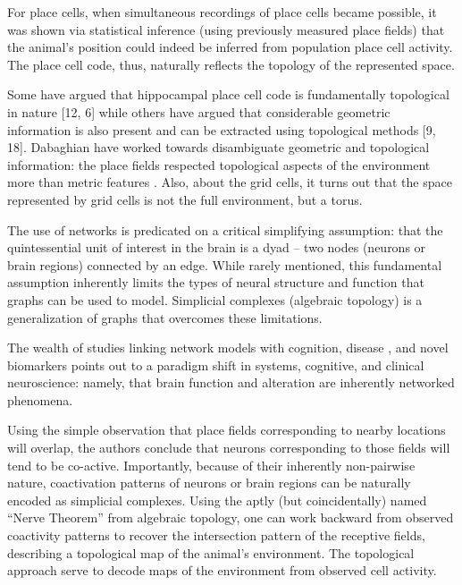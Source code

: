 \documentclass[onecollarge,runningheads]{svjour2}
\begin{document}
For place cells, when simultaneous recordings of place cells became possible, it was shown via statistical inference (using previously measured place fields) that the animal's position could indeed be inferred from population place cell activity. The place cell code, thus, naturally reflects the topology of the represented space.

\cite{curto2016can} Some have argued that hippocampal place cell code is fundamentally topological in nature [12, 6] while others have argued that considerable geometric information is also present and can be extracted using topological methods [9, 18]. Dabaghian have worked towards disambiguate geometric and topological information: the place fields respected topological aspects of the environment more than metric features \cite{dabaghian2014reconceiving}. Also, about the grid cells, it turns out that the space represented by grid cells is not the full environment, but a torus.

\cite{giusti2016two} The use of networks is predicated on a critical simplifying assumption: that the quintessential unit of interest in the brain is a dyad – two nodes (neurons or brain regions) connected by an edge. While rarely mentioned, this fundamental assumption inherently
limits the types of neural structure and function that graphs can be used to model. Simplicial complexes (algebraic topology) is a generalization of graphs that overcomes these limitations.

The wealth of studies linking network models with cognition, disease \cite{stefan2013epileptic}, \cite{stam2014modern} and novel biomarkers points out to a paradigm shift in systems, cognitive, and clinical neuroscience: namely, that brain function and alteration are inherently networked phenomena.


Using the simple observation that place fields corresponding to nearby locations will overlap, the authors conclude that neurons corresponding to those fields will tend to be co-active. Importantly, because of their inherently non-pairwise nature, coactivation patterns of neurons or brain regions can be naturally encoded as simplicial complexes. 
Using the aptly (but coincidentally) named “Nerve Theorem” from algebraic topology, one can work backward from observed coactivity patterns to recover the intersection pattern of the receptive fields, describing a topological map of the animal’s environment.
The topological approach serve to decode maps of the environment from observed cell activity.
\end{document}
